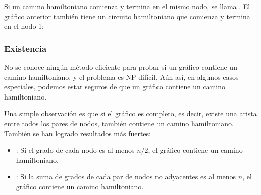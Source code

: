 Si un camino hamiltoniano comienza y termina en el mismo nodo,
se llama .
El gráfico anterior también tiene un circuito hamiltoniano
que comienza y termina en el nodo 1:
\begin{center}
\end{center}

\subsubsection{Existencia}

No se conoce ningún método eficiente para probar si un gráfico
contiene un camino hamiltoniano, y el problema es NP-difícil.
Aún así, en algunos casos especiales, podemos estar seguros
de que un gráfico contiene un camino hamiltoniano.

Una simple observación es que si el gráfico es completo,
es decir, existe una arista entre todos los pares de nodos,
también contiene un camino hamiltoniano.
También se han logrado resultados más fuertes:

\begin{itemize}
\item
{}
: %
Si el grado de cada nodo es al menos $n/2$,
el gráfico contiene un camino hamiltoniano.
\item
{}
: %
Si la suma de grados de cada par de nodos no adyacentes
es al menos $n$,
el gráfico contiene un camino hamiltoniano.
\end{itemize}

